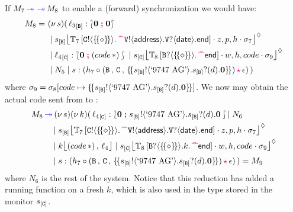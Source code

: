 \documentclass[runningheads,plain]{llncs}
\begin{document}
If $M_7 \textcolor{blue}{\,\twoheadrightarrow\,} \textcolor{blue}{\,\twoheadrightarrow\,} M_8$ to enable a (forward) synchronization 
we would have:
\begin{align*}
M_8  =~ &    \news{s}(\,  \np{\key{{\loc_3}}{\pB}}{ \conf{\inact}{\inact}} 
\\
& \Par \hmoni{\ep{s}{\pB}}{\myctxr{\ctx{T}_7}{\ltout{C}{\thunkt}{\past\ltout{\pS}{\mathsf{address}}{\ltinp{\pS}{\mathsf{date}}{\lend}}}}}{z,p,h}{\store_7} 
\\
& \Par \np{\key{{\loc_4}}{\pC}}{ \conf{\inact}{(\appl{code}{\dummyn}) }} 
 \Par 
\hmoni{\ep{s}{\pC}}{\myctxr{\ctx{T}_8}{ \ltinp{B}{\thunkt}{\past\lend}}}{w,h,code}{\store_9} 
\\
& 
\Par N_5 \Par \codah{s}{h_7 \cons \valueq{\pB}{\pC}{\thunkp{\bout{\epB}{\text{`9747 AG'}}\binp{\epB}{d}\inact}}}{\emp}{}~) 
\end{align*}
where
$\sigma_9 = \sigma_8 [code\mapsto \{\!\{s_{[\mathtt{B}]} ! \langle \text{`9747 AG'} \rangle .s_{[\mathtt{B}]} ? (d) .\mathbf{0}\}\!\}]$.
We now may 
obtain the actual code sent from \pB to \pC:
\begin{align*}
M_8  \fw &  \news{s}\news{k}(\,  
\np{\key{{\loc_4}}{\pC}}{\conf{\inact}{\bout{\epB}{\text{`9747 AG'}}\binp{\epB}{d}\inact}} 
\!\!  \Par N_6 
\\
& \!\!\Par \hmoni{\ep{s}{\pB}}{\myctxr{\ctx{T}_7}{\ltout{C}{\thunkt}{\past\ltout{\pS}{\mathsf{address}}{\ltinp{\pS}{\mathsf{date}}{\lend}}}}}{z,p,h}{\store_7} 
\\
& \!\!\Par 
\mem{k}{(\appl{code}{\dummyn})}{{\loc_4}} 
\Par 
\hmoni{\ep{s}{\pC}}{\myctxr{\ctx{T}_8}{ \ltinp{B}{\thunkt}{k.\past\lend}}}{w,h,code}{\store_9} 
\\
& 
\!\!\Par \codah{s}{h_7 \cons \valueq{\pB}{\pC}{\thunkp{\bout{\epB}{\text{`9747 AG'}}\binp{\epB}{d}\inact}}}{\emp}{}~) 
= M_9
\end{align*}
where $N_6$ is the rest of the system. 
Notice that this reduction has added a running function on a fresh 
$k$, which is also used  in the type stored in the monitor $s_{[\mathtt{C}]}$.
\end{document}
